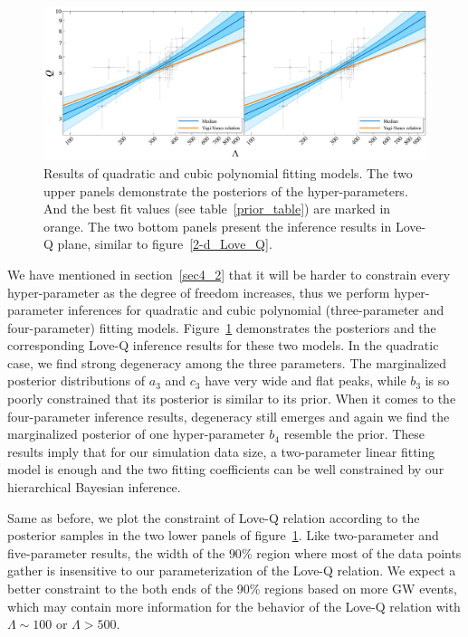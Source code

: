 \documentclass[a4paper,11pt]{article}
\begin{document}
\begin{figure}
    \begin{minipage}[t]{\textwidth}
    \includegraphics[width=\linewidth]{hierarchical_results_AP4_3d.pdf}%
    \end{minipage}
    \caption{\label{3-d_4-d_Love_Q} Results of quadratic and cubic polynomial fitting models. The 
    two upper panels demonstrate the posteriors of the hyper-parameters. And the best fit values (see table~\ref{prior_table}) 
    are marked in orange. The two bottom panels present the inference results in Love-Q plane, similar to 
    figure~\ref{2-d_Love_Q}.
    }
\end{figure}

We have mentioned in section~\ref{sec4_2} that it will be harder to constrain every hyper-parameter as the 
degree of freedom increases, thus we perform hyper-parameter inferences for quadratic and cubic polynomial (three-parameter and four-parameter) fitting models. Figure~\ref{3-d_4-d_Love_Q} demonstrates the posteriors and the corresponding Love-Q inference results for these two models. In the quadratic case, we find strong degeneracy among the three parameters. The marginalized posterior distributions of $a_3$ and $c_3$ have very wide and flat peaks, while $b_3$ is so poorly constrained that its posterior is similar to its prior. When it comes to the four-parameter inference results, degeneracy still emerges and again we find the marginalized posterior of one hyper-parameter $b_4$ resemble the prior. These results imply that for our simulation data size, a two-parameter linear fitting model is enough and the two fitting coefficients can be well constrained by our hierarchical Bayesian inference.

Same as before, we plot the constraint of Love-Q relation according to the posterior samples in the two lower panels 
of figure~\ref{3-d_4-d_Love_Q}. Like two-parameter and five-parameter results, the width of the $90\%$ region where most of the data points gather is insensitive to our parameterization of the Love-Q relation. We expect a better constraint to the both ends of the 90\% regions based on more GW events, which may contain more information for the behavior of the Love-Q relation with $\Lambda \sim 100$ or $\Lambda > 500$.
\end{document}
